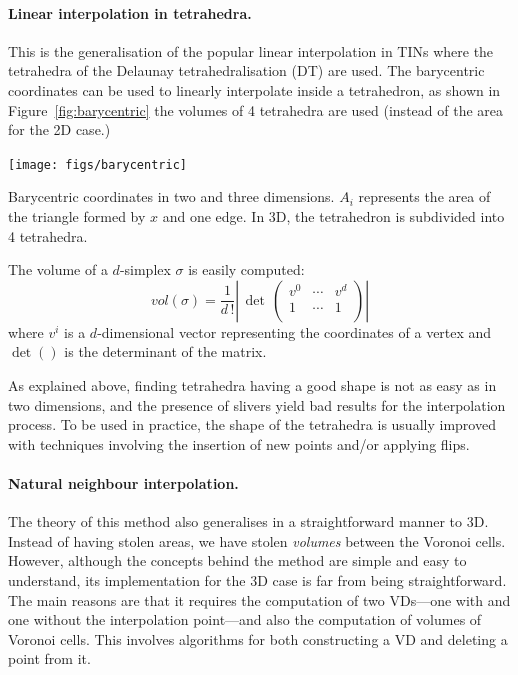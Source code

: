 \paragraph{Linear interpolation in tetrahedra.}
This is the generalisation of the popular linear interpolation in TINs where the tetrahedra of the Delaunay tetrahedralisation (DT) are used. 
The barycentric coordinates can be used to linearly interpolate inside a tetrahedron, as shown in Figure~\ref{fig:barycentric} the volumes of 4 tetrahedra are used (instead of the area for the 2D case.)
\begin{marginfigure}
  \centering
  \texttt{[image: figs/barycentric]}
  \caption[Barycentric coordinates in two and three dimensions]{Barycentric coordinates in two and three dimensions. $A_i$ represents the area of the triangle formed by $x$ and one edge. In 3D, the tetrahedron is subdivided into 4 tetrahedra.}%
\label{fig:barycentric}
\end{marginfigure}

The volume of a $d$-simplex $\sigma$ is easily computed:
\begin{equation}
vol(\sigma) = \frac{1}{d \, !} \left| \,  
                            \det \, \left( 
                                  \begin{array}{ccc}
                                    v^{0} & \cdots & v^{d} \\
                                    1     & \cdots & 1 \\
                                  \end{array}
                                \right)
                        \right|
\end{equation}  
where $v^{i}$ is a $d$-dimensional vector representing the coordinates of a vertex and $\det()$ is the determinant of the matrix. 

As explained above, finding tetrahedra having a good shape is not as easy as in two dimensions, and the presence of slivers yield bad results for the interpolation process. 
To be used in practice, the shape of the tetrahedra is usually improved with techniques involving the insertion of new points and/or applying flips.


\paragraph{Natural neighbour interpolation.}
The theory of this method also generalises in a straightforward manner to 3D.
Instead of having stolen areas, we have stolen \emph{volumes} between the Voronoi cells.
However, although the concepts behind the method are simple and easy to understand, its implementation for the 3D case is far from being straightforward. 
The main reasons are that it requires the computation of two VDs---one with and one without the interpolation point---and also the computation of volumes of Voronoi cells. 
This involves algorithms for both constructing a VD and deleting a point from it.


